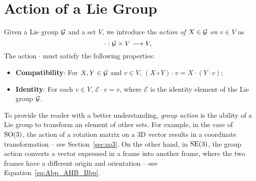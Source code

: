 \section{Action of a Lie Group \label{sec:action_lie}}
Given a Lie group $\mathcal{G}$ and a set $V$, we introduce the \emph{action of} $X \in \mathcal{G}$ \emph{on} $v \in V$ as
\begin{equation}
    \cdot : \mathcal{G} \times V \longrightarrow V,
\end{equation}
The action $\cdot$ must satisfy the following properties:
\begin{itemize}
    \item \textbf{Compatibility}: For $X,Y \in \mathcal{G}$ and $v \in V$, $(X \circ Y) \cdot v = X \cdot (Y \cdot v)$;
    \item \textbf{Identity}: For each $v \in V$, $\mathcal{E} \cdot v = v$, where $\mathcal{E}$ is the identity element of the Lie group $\mathcal{G}$.
\end{itemize}
To provide the reader with a better understanding, \emph{group action} is the ability of a Lie group to transform an element of other sets. 
For example, in the case of $\mathrm{SO}(3)$, the action of a rotation matrix on a 3D vector results in a coordinate transformation -- see Section~\ref{sec:so3}. On the other hand, in ${\mathrm{SE}}(3)$, the group action converts a vector expressed in a frame into another frame, where the two frames have a different origin and orientation -- see Equation~\eqref{eq:Abp_AHB_Bbp}.

